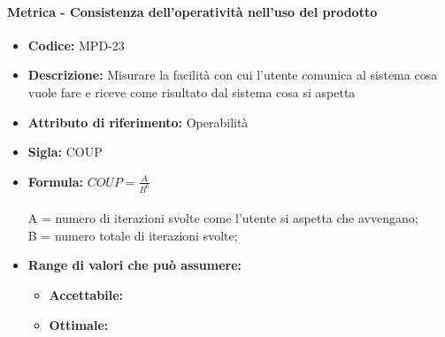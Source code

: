                   \paragraph{Metrica - Consistenza dell'operatività nell'uso del prodotto} 
            \begin{itemize}
           \item   \textbf{Codice:} MPD-23
           \item   \textbf{Descrizione:} Misurare la facilità con cui l'utente comunica al sistema cosa vuole fare e riceve come risultato dal sistema cosa si aspetta
           \item   \textbf{Attributo di riferimento:} Operabilità
           \item   \textbf{Sigla:} COUP
          \item    \textbf{Formula:} \begin{math}COUP = \frac{A}{B^6}\end{math}\\ \\
            A = numero di iterazioni svolte come l'utente si aspetta che avvengano;\\
            B = numero totale di iterazioni svolte;
            \item \textbf{Range di valori che può assumere:}
        \begin{itemize}
            \item \textbf{Accettabile:} 
            \item \textbf{Ottimale:} 
        \end{itemize}
       \end{itemize}
       
